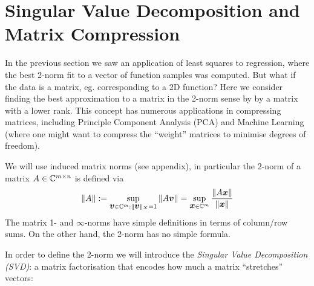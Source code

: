 
\section{Singular Value Decomposition and Matrix Compression}
In the previous section we saw an application of least squares to regression, where the best 2-norm fit to a vector of function samples was computed. But what if the data is a matrix, eg. corresponding to a 2D function? Here we consider finding the best approximation to a matrix in the 2-norm sense by by a matrix with a  lower rank.  This concept has numerous applications in compressing matrices, including  Principle Component Analysis (PCA) and Machine Learning (where one might want to compress the ``weight'' matrices to minimise degrees of freedom). 

We will use induced matrix norms (see appendix), in particular the 2-norm of a matrix $A \in {\mathbb C}^{m \times n}$ is defined via
\[
\| A \| :=  \sup_{\bm{{\mbox{\boldmath$v$\unboldmath}}} \in {\mathbb C}^m : \|\bm{{\mbox{\boldmath$v$\unboldmath}}}\|_X=1} \|A \bm{{\mbox{\boldmath$v$\unboldmath}}}\| =  \sup_{\bm{{\mbox{\boldmath$x$\unboldmath}}} \in {\mathbb C}^m} {\|A \bm{{\mbox{\boldmath$x$\unboldmath}}}\| \over \| \bm{{\mbox{\boldmath$x$\unboldmath}}}\|}
\]
The matrix 1- and $\ensuremath{\infty}$-norms have simple definitions in terms of column/row sums. On the other hand, the 2-norm has no simple formula. 

In order to define the 2-norm we will introduce the  \emph{Singular Value Decomposition (SVD)}: a matrix factorisation that encodes how much a matrix ``stretches''  vectors:

